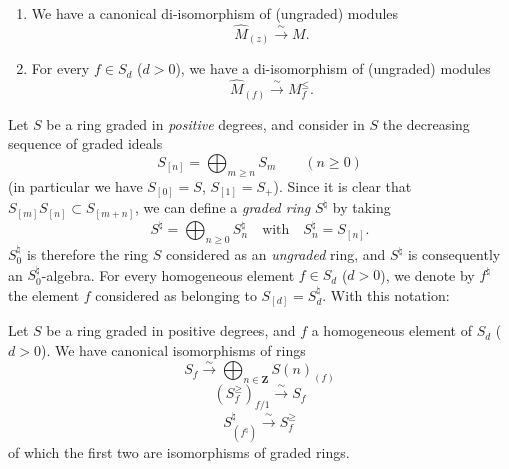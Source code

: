 \begin{lemma}[8.2.5]
\label{II.8.2.5}
\begin{enumerate}
\item[\rm(i)] We have a canonical di-isomorphism of (ungraded) modules
\begin{equation}
\label{II.8.2.5.1}
  \widehat{M}_{(z)}\xrightarrow{\sim}M.
\tag{8.2.5.1}
\end{equation}
\item[\rm(ii)] For every $f\in S_d$ ($d>0$), we have a di-isomorphism of
(ungraded) modules
\begin{equation}
\label{II.8.2.5.2}
  \widehat{M}_{(f)}\xrightarrow{\sim}M_f^{\leq}.
\tag{8.2.5.2}
\end{equation}
\end{enumerate}
\end{lemma}

\begin{env}[8.2.6]
\label{II.8.2.6}
Let $S$ be a ring graded in \emph{positive} degrees, and consider in $S$
the decreasing sequence of graded ideals
\begin{equation}
\label{II.8.2.6.1}
  S_{[n]}=\bigoplus_{m\geq n}S_m\qquad(n\geq0)
\tag{8.2.6.1}
\end{equation}
(in particular we have $S_{[0]}=S$, $S_{[1]}=S_+$). Since it is clear that
$S_{[m]}S_{[n]}\subset S_{[m+n]}$, we can define a \emph{graded ring}
$S^\natural$ by taking
\begin{equation}
\label{II.8.2.6.2}
  S^\natural=\bigoplus_{n\geq0}S_n^\natural
  \quad\text{with}\quad S_n^\natural=S_{[n]}.
\tag{8.2.6.2}
\end{equation}
$S_0^\natural$ is therefore the ring $S$ considered as an \emph{ungraded} ring,
and $S^\natural$ is consequently an $S_0^\natural$-algebra. For every
homogeneous element $f\in S_d$ ($d>0$), we denote by $f^\natural$ the element
$f$ considered as belonging to $S_{[d]}=S_d^\natural$. With this
notation:
\end{env}


\begin{lemma}[8.2.7]
\label{II.8.2.7}
Let $S$ be a ring graded in positive degrees, and $f$ a homogeneous element of
$S_d$ ($d>0$). We have canonical isomorphisms of rings
\begin{equation}
\label{II.8.2.7.1}
  S_f\xrightarrow{\sim}\bigoplus_{n\in\mathbf{Z}}S(n)_{(f)}
\tag{8.2.7.1}
\end{equation}
\begin{equation}
\label{II.8.2.7.2}
  (S_f^{\geq})_{f/1}\xrightarrow{\sim}S_f
\tag{8.2.7.2}
\end{equation}
\begin{equation}
\label{II.8.2.7.3}
  S^\natural_{(f^\natural)}\xrightarrow{\sim}S_f^{\geq}
\tag{8.2.7.3}
\end{equation}
of which the first two are isomorphisms of graded rings.
\end{lemma}

